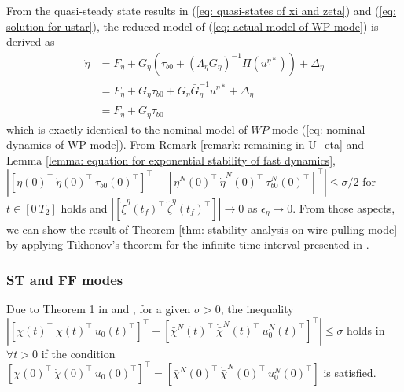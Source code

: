 \documentclass[letterpaper, 10 pt, conference]{ieeeconf}  %
\theoremstyle{definition}
\begin{document}
From the quasi-steady state results in (\ref{eq: quasi-states of xi and zeta}) and (\ref{eq: solution for ustar}), the reduced model of (\ref{eq: actual model of WP mode}) is derived as
\begin{equation}
    \begin{split}
        \ddot{\eta} &= F_{\eta} + G_{\eta}(\tau_{b 0}+(\Lambda_{\eta}\bar{G}_{\eta})^{-1}\Pi(u^{\eta *})) + \Delta_{\eta} \\
        &= F_{\eta} + G_{\eta}\tau_{b 0}+ G_{\eta}\bar{G}_{\eta}^{-1}u^{\eta *} + \Delta_{\eta} \\
        &= \bar{F}_{\eta} + \bar{G}_{\eta}\tau_{b 0}
    \end{split}
\end{equation}
which is exactly identical to the nominal model of $WP$ mode (\ref{eq: nominal dynamics of WP mode}). From Remark \ref{remark: remaining in U_eta} and Lemma \ref{lemma: equation for exponential stability of fast dynamics}, $| [\eta(0)^{\top} \ \dot{\eta}(0)^{\top} \ \tau_{b 0}(0)^{\top}]^{\top} - [\bar{\eta}^N(0)^{\top} \ \bar{\dot{\eta}}^N(0)^{\top} \ \bar{\tau}^N_{b 0}(0)^{\top}]^{\top} | \leq \sigma/2$ for $t \in [0 \ T_2]$ holds and $| [\tilde{\xi}^{\eta}(t_f)^{\top} \ \tilde{\zeta}^{\eta}(t_f)^{\top}] | \rightarrow 0$ as $\epsilon_{\eta} \rightarrow 0$. From those aspects, we can show the result of Theorem \ref{thm: stability analysis on wire-pulling mode} by applying Tikhonov's theorem for the infinite time interval presented in \cite[p.456]{khalil2002nonlinear}.

\subsubsection{ST and FF modes}
Due to Theorem 1 in \cite{lee2020aerial_2} and \cite{kim2017robust}, for a given $\sigma > 0$, the inequality $| [\chi(t)^{\top} \ \dot{\chi}(t)^{\top} \ u_0(t)^{\top}]^{\top} - [\bar{\chi}^N(t)^{\top} \ \dot{\bar{\chi}}^N(t)^{\top} \ u_0^{N}(t)^{\top}]^{\top} | \leq \sigma$ holds in $\forall t > 0$ if the condition $[\chi(0)^{\top} \ \dot{\chi}(0)^{\top} \ u_0(0)^{\top}]^{\top} = [\bar{\chi}^N(0)^{\top} \ \dot{\bar{\chi}}^N(0)^{\top} \ u_0^{N}(0)^{\top}]$ is satisfied.
\end{document}
